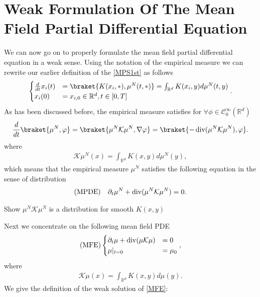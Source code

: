 \section{Weak Formulation Of The Mean Field Partial Differential Equation}
We can now go on to properly formulate the mean field partial differential equation in a weak sense. Using the notation of the empirical measure we can rewrite our earlier definition of the \autoref{MPS1st} as follows
\begin{align*}
  \begin{cases}
    \frac{d}{dt} x_i(t) &= \braket{K(x_i,*),\mu^N(t,*)} = \int_{\mathbb{R}^{d} } K(x_{i},y) d\mu ^{N} (t,y)\\
    x_i(0)&=x_{i,0} \in \mathbb{R}^{d} , t \in [0,T]
  \end{cases}
.\end{align*}
As has been discussed before, the empirical measure satisfies for $\forall  \phi  \in \mathcal{C}_0^{\infty}(\mathbb{R}^{d} ) $ 
\begin{align*}
  \frac{d}{dt} \braket{\mu ^{N},\phi  } = \braket{\mu ^{N}\mathcal{K}\mu ^{N},\nabla \phi   } = \braket{- \divergence(\mu^N \mathcal{K} \mu ^{N} ),\phi }
.\end{align*}
where 
\begin{align*}
  \mathcal{K}\mu ^{N}(x) = \int_{\mathbb{R}^{d} }  K(x,y) d\mu ^{N} (y)
,\end{align*}
which means that the empirical measure $\mu ^{N} $ satisfies the following equation in the 
sense of distribution 
\begin{align*}
  \text{(MPDE)} \quad \partial_t \mu ^{N}  + \operatorname{div}(\mu ^{N}\mathcal{K}\mu ^{N}  ) = 0
.\end{align*}
\begin{exercise}
 Show $\mu ^{N}\mathcal{K}\mu ^{N}  $  is a distribution for smooth $K(x,y)$ 
\end{exercise}
\vskip5mm
Next we concentrate on the following mean field PDE
 \begin{align}\label{MFE}
  \text{(MFE)}\begin{cases}
    \partial_t\mu + \operatorname{div} (\mu \mathcal{K}\mu ) &= 0\\
    \mu \rvert_{t=0} &= \mu_0
  \end{cases}
 ,\end{align}
 where
\begin{align*}
  \mathcal{K}\mu (x) = \int_{\mathbb{R}^{d} }  K(x,y) d\mu (y)
.\end{align*}
We give the definition of the weak solution of \autoref{MFE}:
